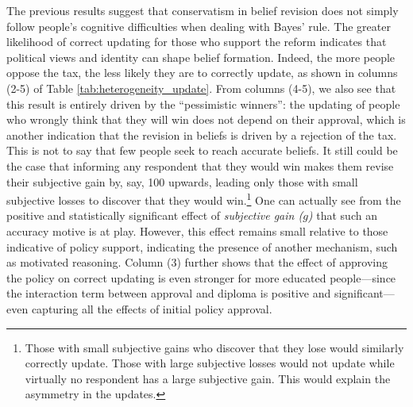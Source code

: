 \documentclass[12pt]{article} %
\begin{document}
\begin{appendices}
The previous results suggest that conservatism in belief revision does not simply follow people's cognitive difficulties when dealing with Bayes' rule. The greater likelihood of correct updating for those who support the reform indicates that political views and identity can shape belief formation. Indeed, the more people oppose the tax, the less likely they are to correctly update, as shown in columns (2-5) of Table \ref{tab:heterogeneity_update}. From columns (4-5), we also see that this result is entirely driven by the ``pessimistic winners'': the updating of people who wrongly think that they will win does not depend on their approval, which is another indication that the revision in beliefs is driven by a rejection of the tax. This is not to say that few people seek to reach accurate beliefs. It still could be the case that informing any respondent that they would win makes them revise their subjective gain by, say, 100\euros{} upwards, leading only those with small subjective losses to discover that they would win.\footnote{Those with small subjective gains who discover that they lose would similarly correctly update. Those with large subjective losses would not update while virtually no respondent has a large subjective gain. This would explain the asymmetry in the updates.} One can actually see from the positive and statistically significant effect of \textit{subjective gain ($g$)} that such an accuracy motive is at play. However, this effect remains small relative to those indicative of policy support, indicating the presence of another mechanism, such as motivated reasoning. Column (3) further shows that the effect of approving the policy on correct updating is even stronger for more educated people---since the interaction term between approval and diploma is positive and significant---even capturing all the effects of initial policy approval. %


\end{appendices}
\end{document}
